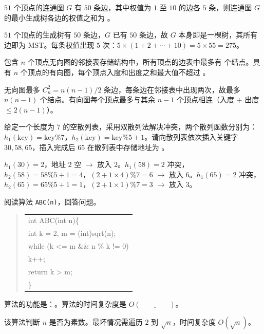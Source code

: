 \begin{question}
$51$ 个顶点的连通图 $G$ 有 $50$ 条边，其中权值为 $1$ 至 $10$ 的边各 $5$ 条，则连通图 $G$ 的最小生成树各边的权值之和为 \underline{\hspace{4em}}。
\begin{solution}
$51$ 个顶点的生成树有 $50$ 条边，$G$ 已有 $50$ 条边，故 $G$ 本身即是一棵树，其所有边即为 MST。每条权值出现 $5$ 次：$5\times(1+2+\cdots+10)=5\times55=275$。
\end{solution}
\end{question}

\begin{question}
包含 $n$ 个顶点无向图的邻接表存储结构中，所有顶点的边表中最多有 \underline{\hspace{4em}} 个结点。具有 $n$ 个顶点的有向图，每个顶点入度和出度之和最大值不超过 \underline{\hspace{4em}}。
\begin{solution}
无向图最多 $C_n^2=n(n-1)/2$ 条边，每条边在邻接表中出现两次，故最多 $n(n-1)$ 个结点。有向图每个顶点最多与其余 $n-1$ 个顶点相连（入度 $+$ 出度 $\le 2(n-1)$）。
\end{solution}
\end{question}

\begin{question}
给定一个长度为 $7$ 的空散列表，采用双散列法解决冲突，两个散列函数分别为：$h_1(\text{key})=\text{key}\%7$，$h_2(\text{key})=\text{key}\%5+1$。请向散列表依次插入关键字 $30,58,65$，插入完成后 $65$ 在散列表中存储地址为 \underline{\hspace{4em}}。
\begin{solution}
$h_1(30)=2$，地址 2 空 $\to$ 放入 2。$h_1(58)=2$ 冲突，$h_2(58)=58\%5+1=4$，$(2+1\times4)\%7=6$ $\to$ 放入 6。$h_1(65)=2$ 冲突，$h_2(65)=65\%5+1=1$，$(2+1\times1)\%7=3$ $\to$ 放入 3。
\end{solution}
\end{question}

\begin{question}
阅读算法 \texttt{ABC(n)}，回答问题。
\begin{quote}
\footnotesize
\begin{tabular}{@{}l@{}}
int ABC(int n)\{\\
    int k = 2, m = (int)sqrt(n);\\
    while (k <= m \&\& n \% k != 0)\\
        k++;\\
    return k > m;\\
\}\\
\end{tabular}
\end{quote}
算法的功能是：\underline{\hspace{4em}}。算法的时间复杂度是 $O(\underline{\hspace{4em}})$。
\begin{solution}
该算法判断 $n$ 是否为素数。最坏情况需遍历 $2$ 到 $\sqrt{n}$，时间复杂度 $O(\sqrt{n})$。
\end{solution}
\end{question}


